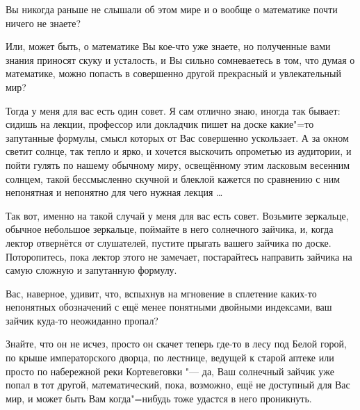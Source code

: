 Вы никогда раньше не слышали об этом мире и о вообще о математике почти ничего
не знаете?

Или, может быть, о математике Вы кое-что уже знаете, но полученные вами знания
приносят скуку и усталость, и Вы сильно сомневаетесь в том, что думая о
математике, можно попасть в совершенно другой прекрасный и увлекательный мир?

Тогда у меня для вас есть один совет.
Я сам отлично знаю, иногда так бывает: сидишь на лекции, профессор или докладчик
пишет на доске какие"=то запутанные формулы, смысл которых от Вас совершенно
ускользает.
А за окном светит солнце, так тепло и ярко, и хочется выскочить опрометью из
аудитории, и пойти гулять по нашему обычному миру, освещённому этим ласковым
весенним солнцем, такой бессмысленно скучной и блеклой кажется по сравнению с
ним непонятная и непонятно для чего нужная лекция \ldots

Так вот, именно на такой случай у меня для вас есть совет.
Возьмите зеркальце, обычное небольшое зеркальце, поймайте в него солнечного
зайчика, и, когда лектор отвернётся от слушателей, пустите прыгать вашего
зайчика по доске.
Поторопитесь, пока лектор этого не замечает, постарайтесь направить зайчика на
самую сложную и запутанную формулу.

Вас, наверное, удивит, что, вспыхнув на мгновение в сплетение каких-то
непонятных обозначений с ещё менее понятными двойными индексами, ваш зайчик
куда-то неожиданно пропал?

Знайте, что он не исчез, просто он скачет теперь где-то в лесу под Белой горой,
по крыше императорского дворца, по лестнице, ведущей к старой аптеке или просто
по набережной реки Кортевеговки "--- да, Ваш солнечный зайчик уже попал в тот
другой, математический, пока, возможно, ещё не доступный для Вас мир, и может
быть Вам когда"=нибудь тоже удастся в него проникнуть.
